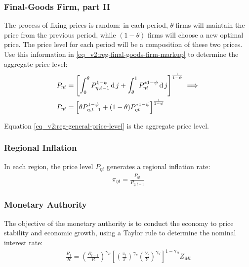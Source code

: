 \documentclass[../thesis.tex]{subfiles}
\begin{document}
\subsubsection*{Final-Goods Firm, part II}

The process of fixing prices is random: in each period, $\theta$ firms will maintain the price from the previous period, while $(1-\theta)$ firms will choose a new optimal price. The price level for each period will be a composition of these two prices. Use this information in \ref{eq_v2:reg-final-goods-firm-markup} to determine the aggregate price level:
\begin{align}
	P_{\eta t} & = \left[ \int_{0}^{\theta} P_{\eta, t-1}^{1-\psi} \operatorname{d} j + \int_{\theta}^{1} P_{\eta t}^{\ast 1-\psi} \operatorname{d} j \right]^{\frac{1}{1-\psi}}  \implies \nonumber \\
	P_{\eta t} & = \left[ \theta P_{\eta, t-1}^{1-\psi} + (1-\theta) P_{\eta t}^{\ast 1-\psi} \right]^\frac{1}{1-\psi} \label{eq_v2:reg-general-price-level}
\end{align}

Equation \ref{eq_v2:reg-general-price-level} is the aggregate price level.


\subsubsection*{Regional Inflation}

In each region, the price level $P_{\eta t}$ generates a regional inflation rate:
\begin{align}
	\pi_{\eta t} = \frac{P_{\eta t}}{P_{\eta, t-1}} \label{eq_v2:reg-regional-inflation}
\end{align}


\subsubsection{Monetary Authority}

The objective of the monetary authority is to conduct the economy to price stability and economic growth, using a Taylor rule \cite{taylor_discretion_1993} to determine the nominal interest rate:
\begin{align}
	\label{eq_v2:reg-monetary-policy}
	\frac{R_{t}}{R} =
	\left( \frac{R_{t-1}}{R} \right)^{\gamma_{R}}  \left[
	\left( \frac{\pi_t}{\pi} \right)^{\gamma_{\pi}}
	\left( \frac{Y_{t}}{Y} \right)^{\gamma_{Y}} \right]^{1-\gamma_{R}} Z_{Mt}
\end{align}
\end{document}
